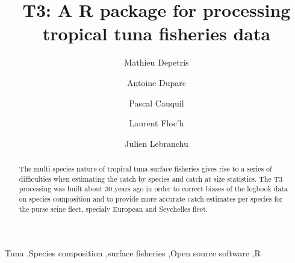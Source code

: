 \documentclass[12pt, a4paper,preprint,review]{elsarticle}
\newcommand{\orcid}[1]{\hspace*{0.1em}\href{https://orcid.org/#1}{\color{idcolor}\aiOrcid}}
\begin{document}
\begin{frontmatter}



\title{T3: A R package for processing tropical tuna fisheries data}

\author[ob7,marbec]{Mathieu Depetris}

\author[ob7,marbec]{\orcid{0000-0001-6135-9015}Antoine Duparc}
\author[ob7,marbec]{\orcid{0000-0003-0718-8950}Pascal Cauquil}
\author[ob7,marbec]{Laurent Floc'h}
\author[ob7,marbec]{\orcid{0000-0002-7759-0534}Julien Lebranchu}


\address[ob7]{\orcid{0000-0002-4642-3418}OB7, IRD, Sète, France.}
\address[marbec]{MARBEC, Univ Montpellier, CNRS, IFREMER, IRD, Montpellier, France.}

\begin{abstract}
The multi-species nature of tropical tuna surface fisheries gives rise to a series of difficulties when estimating the catch by species and catch at size statistics.
The T3 processing was built about 30 years ago in order to correct biases of the logbook data on species composition and to provide more accurate catch estimates per species for the purse seine fleet, specialy European and Seychelles fleet.
\end{abstract}

\begin{keyword}
Tuna \sep Species composition \sep surface fisheries \sep Open source software \sep R



\end{keyword}

\end{frontmatter}
\end{document}
